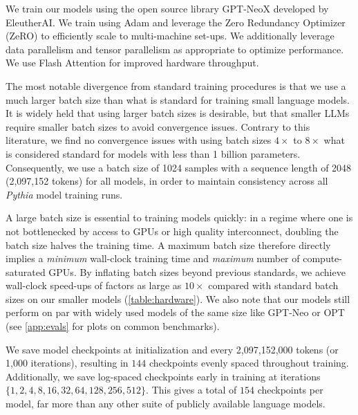 We train our models using the open source library GPT-NeoX \citep{gpt-neox-library} developed by EleutherAI. We train using Adam and leverage the Zero Redundancy Optimizer (ZeRO) \citep{rajbhandari2020zero} to efficiently scale to multi-machine set-ups. We additionally leverage data parallelism \citep{goyal2017dataparallel} and tensor parallelism \citep{megatron-lm} as appropriate to optimize performance. We use Flash Attention \citep{dao2022flashattention} for improved hardware throughput.

The most notable divergence from standard training procedures is that we use a much larger batch size than what is standard for training small language models. It is widely held \citep{mccandlish2018empirical,zhang2019algorithmic,kaplan2020scaling,brown2020language,hoffmann2022training} that using larger batch sizes is desirable, but that smaller LLMs require smaller batch sizes to avoid convergence issues. Contrary to this literature, we find no convergence issues with using batch sizes $4\times$ to $8\times$ what is considered standard for models with less than 1 billion parameters. Consequently, we use a batch size of 1024 samples with a sequence length of 2048 (2,097,152 tokens) for all models, in order to maintain consistency across all \textit{Pythia} model training runs.

A large batch size is essential to training models quickly: in a regime where one is not bottlenecked by access to GPUs or high quality interconnect, doubling the batch size halves the training time. A maximum batch size therefore directly implies a \textit{minimum} wall-clock training time and \textit{maximum} number of compute-saturated GPUs. By inflating batch sizes beyond previous standards, we achieve wall-clock speed-ups of factors as large as $10\times$ compared with standard batch sizes on our smaller models (\ref{table:hardware}). We also note that our models still perform on par with widely used models of the same size like GPT-Neo \citep{black2021gpt} or OPT \citep{zhang2022opt} (see \ref{app:evals} for plots on common benchmarks).

We save model checkpoints at initialization and every 2,097,152,000 tokens (or 1,000 iterations), resulting in $144$ checkpoints evenly spaced throughout training. Additionally, we save log-spaced checkpoints early in training at iterations $\{1,2,4,8,16,32,64,128,256,512\}$. This gives a total of $154$ checkpoints per model, far more than any other suite of publicly available language models.

